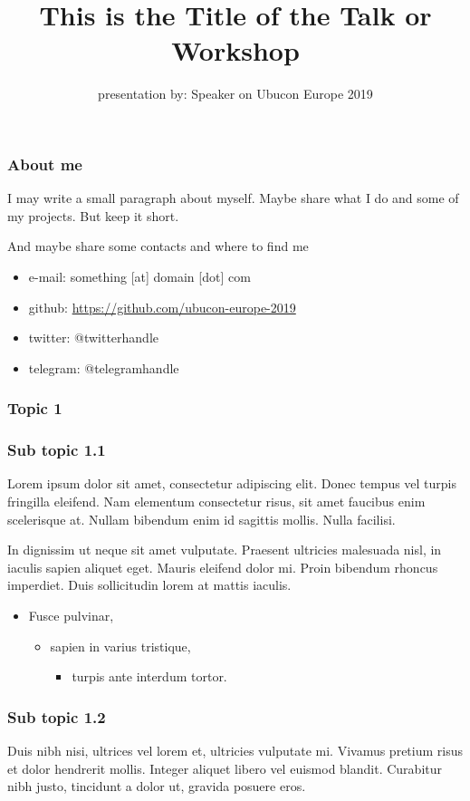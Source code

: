 \documentclass[aspectratio=169]{beamer}
\title{This is the Title of the Talk or Workshop}
\author{presentation by: Speaker on Ubucon Europe 2019}
\begin{document}
\frame[plain]{\titlepage}
 
\begin{frame}
\frametitle{About me}
I may write a small paragraph about myself. Maybe share what I do and some of my projects. But keep it short.

\small{And maybe share some contacts and where to find me}

\begin{itemize}
\item{} e-mail: something [at] domain [dot] com
\item{} github: \url{https://github.com/ubucon-europe-2019}
\item{} twitter: @twitterhandle
\item{} telegram: @telegramhandle
\end{itemize}
\end{frame}

\begin{frame}
\frametitle{Topic 1}
\end{frame}

\begin{frame}
\frametitle{Sub topic 1.1}

Lorem ipsum dolor sit amet, consectetur adipiscing elit.
Donec tempus vel turpis fringilla eleifend.
Nam elementum consectetur risus, sit amet faucibus enim scelerisque at.
Nullam bibendum enim id sagittis mollis. Nulla facilisi.

In dignissim ut neque sit amet vulputate.
Praesent ultricies malesuada nisl, in iaculis sapien aliquet eget.
Mauris eleifend dolor mi. Proin bibendum rhoncus imperdiet.
Duis sollicitudin lorem at mattis iaculis.

\begin{itemize}
	\item{} Fusce pulvinar,
	\begin{itemize}
		\item{} sapien in varius tristique,
		\begin{itemize}
        		\item{} turpis ante interdum tortor.
		\end{itemize}
	\end{itemize}
\end{itemize}

\end{frame}

\begin{frame}
\frametitle{Sub topic 1.2}

Duis nibh nisi, ultrices vel lorem et, ultricies vulputate mi. 
Vivamus pretium risus et dolor hendrerit mollis. 
Integer aliquet libero vel euismod blandit. 
Curabitur nibh justo, tincidunt a dolor ut, gravida posuere eros. 

\end{frame}
\end{document}

